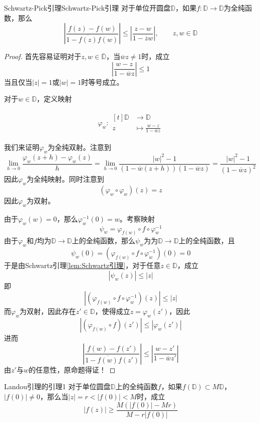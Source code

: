 \documentclass[lang = cn, scheme = chinese, thmcnt = section]{elegantbook}
\newcommand{\sub}{\subset}             %
\newcommand{\function}[5]{
	\begin{align*}
		#1:\begin{aligned}[t]
			#2 &\longrightarrow #3\\
			#4 &\longmapsto #5
		\end{aligned}
	\end{align*}
}                                     %
\begin{document}
\begin{lemma}{Schwartz-Pick引理}{Schwartz-Pick引理}
	对于单位开圆盘$\mathbb{D}$，如果$f:\mathbb{D}\to\mathbb{D}$为全纯函数，那么
	$$
	\left| \frac{f(z)-f(w)}{1-\overline{f(z)}f(w)} \right|
	\le
	\left| \frac{z-w}{1-\overline{z}w} \right|,\qquad
	z,w\in\mathbb{D}
	$$
\end{lemma}

\begin{proof}
	首先容易证明对于$z,w\in\overline{\mathbb{D}}$，当$\overline{w}z\ne1$时，成立
	$$
	\left|\frac{w-z}{1-\overline{w}z}\right|\le1
	$$
	当且仅当$|z|=1$或$|w|=1$时等号成立。
	
	对于$w\in\mathbb{D}$，定义映射
	\function{\varphi_w}{\mathbb{D}}{\mathbb{D}}{z}{\frac{w-z}{1-\overline{w}z}}
	我们来证明$\varphi_w$为全纯双射。注意到
	$$
	\lim_{h\to0}\frac{\varphi_w(z+h)-\varphi_w(z)}{h}=\lim_{h\to0}\frac{|w|^2-1}{(1-\overline{w}(z+h))(1-\overline{w}z)}=\frac{|w|^2-1}{(1-\overline{w}z)^2}
	$$
	因此$\varphi_w$为全纯映射。同时注意到
	$$
	(\varphi_w\circ\varphi_w)(z)=z
	$$
	因此$\varphi_w$为双射。
	
	由于$\varphi_w(w)=0$，那么$\varphi^{-1}_w(0)=w$。考察映射
	$$
	\psi_w=\varphi_{f(w)}\circ f \circ \varphi_w^{-1}
	$$
	由于$\varphi_w$和$f$均为$\mathbb{D}\to\mathbb{D}$上的全纯函数，那么$\psi_w$为为$\mathbb{D}\to\mathbb{D}$上的全纯函数，且
	$$
	\psi_w(0)=(\varphi_{f(w)}\circ f \circ \varphi_w^{-1})(0)=0
	$$
	于是由Schwartz引理\ref{lem:Schwartz引理}，对于任意$z\in\mathbb{D}$，成立
	$$
	|\psi_w(z)|\le|z|
	$$
	即
	$$
	|(\varphi_{f(w)}\circ f \circ \varphi_w^{-1})(z)|\le|z|
	$$
	而$\varphi_w$为双射，因此存在$z'\in\mathbb{D}$，使得成立$z=\varphi_w(z')$，因此
	$$
	|(\varphi_{f(w)}\circ f )(z')|\le|\varphi_w(z')|
	$$
	进而
	$$
	\left| \frac{f(w)-f(z')}{1-\overline{f(w)}f(z')} \right|
	\le
	\left| \frac{w-z'}{1-\overline{w}z'} \right|
	$$
	由$z'$与$w$的任意性，原命题得证！
\end{proof}

\begin{lemma}{}{Landou引理的引理1}
	对于单位圆盘$\mathbb{D}$上的全纯函数$f$，如果$f(\mathbb{D})\sub M\mathbb{D}$，$|f(0)|\ne 0$，那么当$|z|=r<|f(0)|<M$时，成立%
	$$
	|f(z)|\ge\frac{M(|f(0)|-Mr)}{M-r|f(0)|}
	$$
\end{lemma}
\end{document}
